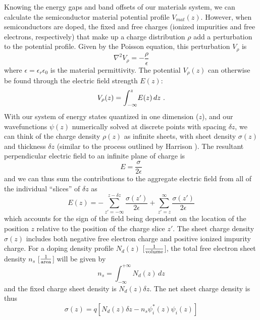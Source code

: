 {Knowing the energy gaps and band offsets of our materials system, we can calculate the semiconductor material potential profile $V_{mat}(z)$. However, when semiconductors are doped, the fixed and free charges (ionized impurities and free electrons, respectively) that make up a charge distribution $\rho$ add a perturbation to the potential profile.  Given by the Poisson equation, this perturbation $V_\rho$ is
\begin{equation}
\nabla^2 V_\rho = -\frac{\rho}{\epsilon}
\end{equation}
where $\epsilon = \epsilon_r \epsilon_0$ is the material permittivity.  The potential $V_\rho(z)$ can otherwise be found through the electric field strength $E(z)$:
\begin{equation}
V_\rho(z)=\int_{-\infty}^z\!E(z)\,dz \textnormal{~.}
\end{equation}
With our system of energy states quantized in one dimension ($z$), and our wavefunctions $\psi(z)$ numerically solved at discrete points with spacing $\delta\!z$, we can think of the charge density $\rho(z)$ as infinite sheets, with sheet density $\sigma(z)$ and thickness $\delta\!z$ (similar to the process outlined by Harrison \cite{Harrison}).  The resultant perpendicular electric field to an infinite plane of charge is
\begin{equation}
E = \frac{\sigma}{2 \epsilon}
\end{equation}
and we can thus sum the contributions to the aggregate electric field from all of the individual ``slices'' of $\delta\!z$ as
\begin{equation}
E(z) = - \sum_{z'=-\infty}^{z-\delta\!z} \frac{\sigma(z')}{2\epsilon} +  \sum_{z'=z}^{\infty} \frac{\sigma(z')}{2\epsilon}
\end{equation}
which accounts for the sign of the field being dependent on the location of the position $z$ relative to the position of the charge slice $z'$.  The sheet charge density $\sigma(z)$ includes both negative free electron charge and positive ionized impurity charge.  For a doping density profile $N_d(z)$ [$\frac{1}{\textnormal{volume}}$], the total free electron sheet density $n_s$ [$\frac{1}{\textnormal{area}}$] will be given by
\begin{equation}
n_s = \int_{-\infty}^{+\infty} \! N_d(z) \, dz
\end{equation}
and the fixed charge sheet density is $N_d(z) \delta\!z$.  The net sheet charge density is thus
\begin{equation}
\label{chpt1eqn:sigma_z}
\sigma(z) = q \left[N_d(z) \delta\!z - n_s \psi_i^*(z) \psi_i(z) \right]

\end{equation}}
